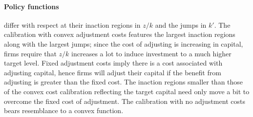 \documentclass[12pt,english]{article}
\theoremstyle{remark}
\begin{document}
	\paragraph{Policy functions}differ with respect at their inaction regions in $z/k$ and the jumps in $k'$. The calibration with convex adjustment costs features the largest inaction regions along with the largest jumps; since the cost of adjusting is increasing in capital, firms require that $z/k$ increases a lot to induce investment to a much higher target level. Fixed adjustment costs imply there is a cost associated with adjusting capital, hence firms will adjust their capital if the benefit from adjusting is greater than the fixed cost. The inaction regions smaller than those of the convex cost calibration reflecting the target capital need only move a bit to overcome the fixed cost of adjustment. The calibration with no adjustment costs bears resemblance to a convex function. 
\end{document}
